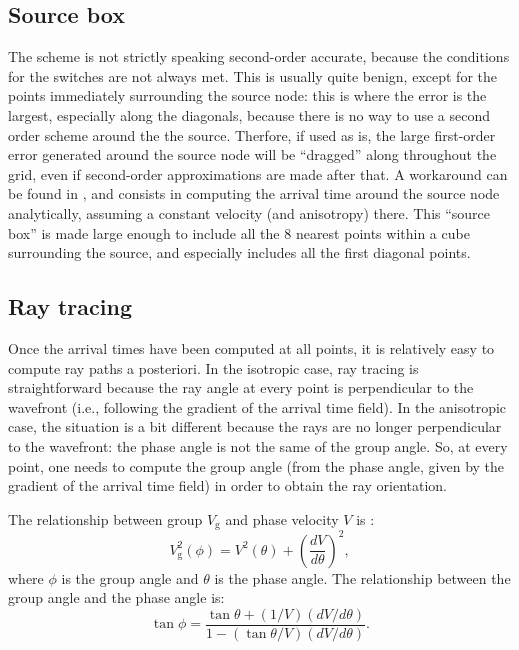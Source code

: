 \documentclass{article}
\begin{document}
\subsection{Source box}

The scheme is not strictly speaking second-order accurate, because the conditions for the switches are not always met. This is usually quite benign, except for the points immediately surrounding the source node: this is where the error is the largest, especially along the diagonals, because there is no way to use a second order scheme around the the source. Therfore, if used as is, the large first-order error generated around the source node will be ``dragged'' along throughout the grid, even if second-order approximations are made after that. A workaround can be found in \citet{rickett99}, and consists in computing the arrival time around the source node analytically, assuming a constant velocity (and anisotropy) there. This ``source box'' is made large enough to include all the 8 nearest points within a cube surrounding the source, and especially includes all the first diagonal points.

\subsection{Ray tracing}

Once the arrival times have been computed at all points, it is relatively easy to compute ray paths a posteriori. In the isotropic case, ray tracing is straightforward because the ray angle at every point is perpendicular to the wavefront (i.e., following the gradient of the arrival time field). In the anisotropic case, the situation is a bit different because the rays are no longer perpendicular to the wavefront: the phase angle is not the same of the group angle. So, at every point, one needs to compute the group angle (from the phase angle, given by the gradient of the arrival time field) in order to obtain the ray orientation.

The relationship between group $V_\mathrm{g}$ and phase velocity $V$ is \citep{thomsen86}:
\begin{equation}
  V_\mathrm{g}^2(\phi) = V^2(\theta) + \left(\frac{dV}{d\theta}\right)^2,
\end{equation}
where $\phi$ is the group angle and $\theta$ is the phase angle.
The relationship between the group angle and the phase angle is:
\begin{equation}
  \tan\phi = \frac{\tan\theta + (1/V)(dV/d\theta)}{1 - (\tan\theta/V)(dV/d\theta)}.
\end{equation}
\end{document}
